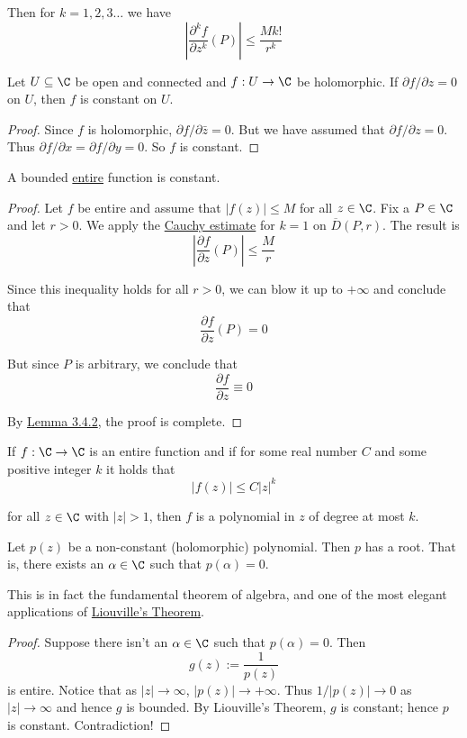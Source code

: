 Then for $k=1,2,3\ldots$ we have
$$
  \left|\frac{\partial^kf}{\partial z^k}(P)\right|\leq\frac{Mk!}{r^k}
$$

\label{c2c7fd1}

Let $U\subseteq\C$ be open and connected and $f:U\to\C$ be holomorphic. If
$\partial f/\partial z=0$ on $U$, then $f$ is constant on $U$.

\begin{proof}
  Since $f$ is holomorphic, $\partial f/\partial\bar z=0$. But we have assumed
  that $\partial f/\partial z=0$. Thus $\partial f/\partial x=\partial f/\partial
  y=0$. So $f$ is constant.
\end{proof}

\label{cf6d8a9}

A bounded \href{d508dc8}{entire} function is constant.

\begin{proof}
  Let $f$ be entire and assume that $|f(z)|\leq M$ for all $z\in\C$. Fix a
  $P\in\C$ and let $r>0$. We apply the \href{a2d8611}{Cauchy estimate} for $k=1$
  on $\overline D(P,r)$. The result is
  $$
    \left|\frac{\partial f}{\partial z}(P)\right|\leq\frac Mr
  $$

  Since this inequality holds for all $r>0$, we can blow it up to $+\infty$ and
  conclude that
  $$
    \frac{\partial f}{\partial z}(P)=0
  $$

  But since $P$ is arbitrary, we conclude that
  $$
    \frac{\partial f}{\partial z}\equiv0
  $$

  By \href{c2c7fd1}{Lemma 3.4.2}, the proof is complete.
\end{proof}

\label{db4ce28}

If $f:\C\to\C$ is an entire function and if for some real number $C$ and some
positive integer $k$ it holds that
$$
  |f(z)|\leq C|z|^k
$$

for all $z\in\C$ with $|z|>1$, then $f$ is a polynomial in $z$ of degree at
most $k$.

\label{ae3b10d}

Let $p(z)$ be a non-constant (holomorphic) polynomial. Then $p$ has a root.
That is, there exists an $\alpha\in\C$ such that $p(\alpha)=0$.

This is in fact the fundamental theorem of algebra, and one of the most elegant
applications of \href{cf6d8a9}{Liouville's Theorem}.

\begin{proof}
  Suppose there isn't an $\alpha\in\C$ such that $p(\alpha)=0$. Then
  $$
    g(z):=\frac1{p(z)}
  $$
  is entire. Notice that as $|z|\to\infty$, $|p(z)|\to+\infty$. Thus
  $1/|p(z)|\to0$ as $|z|\to\infty$ and hence $g$ is bounded. By Liouville's
  Theorem, $g$ is constant; hence $p$ is constant. Contradiction!
\end{proof}


